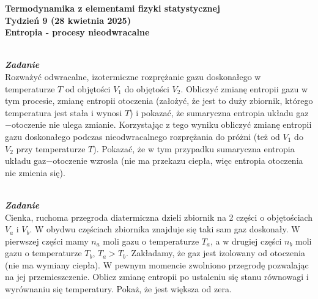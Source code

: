 \documentclass[11pt,a4paper]{article}
\newcounter{zadanie}\newcommand{\zadanie}[1][]{\addtocounter{zadanie}{1} ~\\  {\bf \emph{Zadanie \arabic{zadanie} #1 }} \\}
\begin{document}

\begin{centering}
\bf{\Large{Termodynamika z elementami fizyki statystycznej}}\\
Tydzień 9 (28 kwietnia 2025)\\[3mm]
Entropia - procesy nieodwracalne\\
\end{centering}
\vspace{5mm}

\zadanie
Rozważyć odwracalne, izotermiczne rozprężanie gazu doskonałego w temperaturze $T$
od objętości $V_1$ do objętości $V_2$. Obliczyć zmianę entropii gazu w tym
procesie, zmianę entropii otoczenia (założyć, że jest to duży zbiornik, którego
temperatura jest stała i wynosi $T$) i pokazać, że sumaryczna entropia układu gaz$-$otoczenie
nie ulega zmianie.
Korzystając z tego wyniku obliczyć zmianę entropii gazu doskonałego
podczas nieodwracalnego rozprężania do próżni (też od $V_1$ do $V_2$ przy temperaturze $T$). Pokazać, że w tym przypadku sumaryczna entropia
układu gaz$-$otoczenie wzrosła (nie ma przekazu ciepła, więc entropia otoczenia
nie zmienia się).
\newline


\zadanie
Cienka, ruchoma przegroda diatermiczna dzieli zbiornik na 2 części o objętościach $V_a$ i $V_b$.
W obydwu częściach zbiornika znajduje się taki sam gaz doskonały.
W pierwszej części mamy $n_a$ moli gazu o temperaturze $T_a$, a w drugiej części $n_b$ moli
gazu o temperaturze $T_b$, $T_a >  T_b$.
Zakładamy, że gaz jest izolowany od otoczenia (nie ma wymiany ciepła).
W pewnym momencie zwolniono przegrodę pozwalając na jej przemieszczenie.
Oblicz zmianę entropii po ustaleniu się stanu równowagi i wyrównaniu się temperatury. 
Pokaż, że jest większa od zera.
\newline

\end{document}
